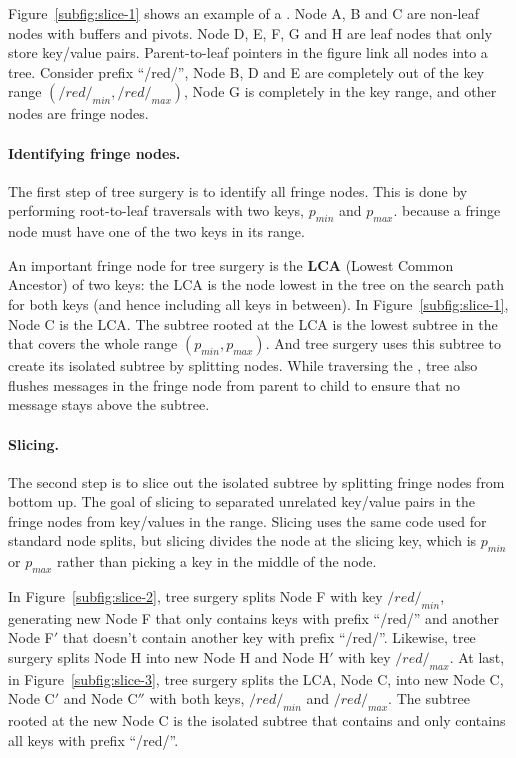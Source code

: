 Figure~\ref{subfig:slice-1} shows an example of a \bet.
Node A, B and C are non-leaf nodes with buffers and pivots.
Node D, E, F, G and H are leaf nodes that only store key/value pairs.
Parent-to-leaf pointers in the figure link all nodes into a tree.
Consider prefix ``/red/'',
Node B, D and E are completely out of the key range $(/red/_{min}, /red/_{max})$,
Node G is completely in the key range, and other nodes are fringe nodes.

\paragraph{Identifying fringe nodes.}
The first step of tree surgery is to identify all fringe nodes.
This is done by performing root-to-leaf traversals with two keys,
$p_{min}$ and $p_{max}$.
because a fringe node must have one of the two keys in its range.

An important fringe node for tree surgery is the \textbf{LCA}
(Lowest Common Ancestor) of two keys: the LCA is the \bet node lowest in the
tree on the search path for both keys (and hence including all keys in between).
In Figure~\ref{subfig:slice-1}, Node C is the LCA.
The subtree rooted at the LCA is the lowest subtree in the \bet that covers
the whole range $(p_{min}, p_{max})$.
And tree surgery uses this subtree to create its isolated subtree by splitting
nodes.
While traversing the \bet, tree also flushes messages in the fringe node from
parent to child to ensure that no message stays above the subtree.

\paragraph{Slicing.}
The second step is to slice out the isolated subtree by splitting fringe nodes
from bottom up.
The goal of slicing to separated unrelated key/value pairs in the fringe nodes
from key/values in the range.
Slicing uses the same code used for standard \bet node splits, but slicing
divides the node at the slicing key, which is $p_{min}$ or $p_{max}$ rather than
picking a key in the middle of the node.

In Figure~\ref{subfig:slice-2}, tree surgery splits Node F with key
$/red/_{min}$, generating new Node F that only contains keys with prefix
``/red/'' and another Node F$'$ that doesn't contain another key with prefix
``/red/''.
Likewise, tree surgery splits Node H into new Node H and Node H$'$ with key
$/red/_{max}$.
At last, in Figure~\ref{subfig:slice-3}, tree surgery splits the LCA, Node C,
into new Node C, Node C$'$ and Node C$''$ with both keys, $/red/_{min}$ and
$/red/_{max}$.
The subtree rooted at the new Node C is the isolated subtree that contains and
only contains all keys with prefix ``/red/''.

